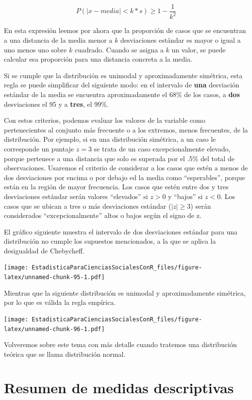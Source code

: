 \documentclass[]{book}
\begin{document}
\[P(|x-media|<k*s) \geq 1-\frac{1}{k^2}\]

En esta expresión leemos por ahora que la proporción de casos que se encuentran a una distancia de la media menor a \(k\) desviaciones estándar es mayor o igual a uno menos uno sobre \(k\) cuadrado. Cuando se asigna a \(k\) un valor, se puede calcular esa proporción para una distancia concreta a la media.

Si se cumple que la distribución es unimodal y aproximadamente simétrica, esta regla se puede simplificar del siguiente modo:
en el intervalo de \textbf{una} desviación estándar de la media se encuentra aproximadamente el 68\% de los casos, a \textbf{dos} desviaciones el 95 y a \textbf{tres}, el 99\%.

Con estos criterios, podemos evaluar los valores de la variable como pertenecientes al conjunto más frecuente o a los extremos, menos frecuentes, de la distribución. Por ejemplo, si en una distribución simétrica, a un caso le corresponde un puntaje \(z=3\) se trata de un caso excepcionalmente elevado, porque pertenece a una distancia que solo es superada por el .5\% del total de observaciones. Usaremos el criterio de considerar a los casos que estén a menos de dos desviaciones por encima o por debajo ed la media como ``esperables'', porque están en la región de mayor frecuencia. Los casos que estén entre dos y tres desviaciones estándar serán valores ``elevados'' si \(z>0\) y ``bajos'' si \(z<0\). Los casos que se ubican a tres o más desviaciones estándar (\(|z|\geq 3\)) serán considerados ``excepcionalmente'' altos o bajos según el signo de z.

El gráfico siguiente muestra el intervalo de dos desviaciones estándar para una distribución no cumple los supuestos mencionados, a la que se aplica la desigualdad de Chebycheff.

\texttt{[image: EstadisticaParaCienciasSocialesConR\_files/figure-latex/unnamed-chunk-95-1.pdf]}

Mientras que la siguiente distribución es unimodal y aproximadamente simétrica, por lo que es válida la regla empírica.

\texttt{[image: EstadisticaParaCienciasSocialesConR\_files/figure-latex/unnamed-chunk-96-1.pdf]}

Volveremos sobre este tema con más detalle cuando tratemos una distribución teórica que se llama distribución normal.

\hypertarget{resumen-de-medidas-descriptivas}{%
\section{Resumen de medidas descriptivas}\label{resumen-de-medidas-descriptivas}}
\end{document}
